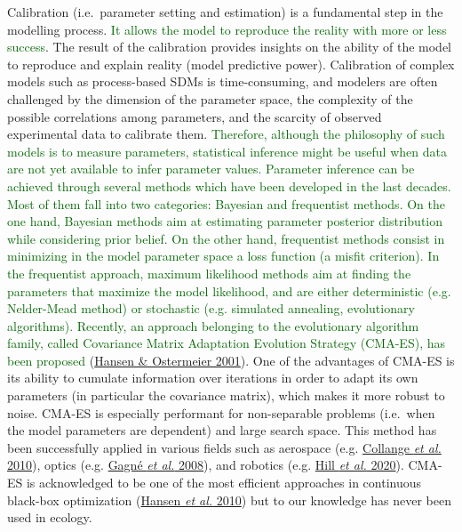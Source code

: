 \documentclass[11pt,]{article}
\begin{document}
Calibration (i.e.~parameter setting and estimation) is a fundamental
step in the modelling process.
\textcolor{darkgreen}{It allows the model to reproduce the reality with more or less success}.
The result of the calibration provides insights on the ability of the
model to reproduce and explain reality (model predictive power).
Calibration of complex models such as process-based SDMs is
time-consuming, and modelers are often challenged by the dimension of
the parameter space, the complexity of the possible correlations among
parameters, and the scarcity of observed experimental data to calibrate
them.
\textcolor{darkgreen}{Therefore, although the philosophy of such models is to measure parameters, statistical inference might be useful when data are not yet available to infer parameter values. Parameter inference can be achieved through several methods which have been developed in the last decades. Most of them fall into two categories: Bayesian and frequentist methods. On the one hand, Bayesian methods aim at estimating parameter posterior distribution while considering prior belief. On the other hand, frequentist methods consist in minimizing in the model parameter space a loss function (a misfit criterion). In the frequentist approach, maximum likelihood methods aim at finding the parameters that maximize the model likelihood, and are either deterministic (e.g. Nelder-Mead method) or stochastic (e.g. simulated annealing, evolutionary algorithms).     
Recently, an approach belonging to the evolutionary algorithm family, called Covariance Matrix Adaptation Evolution Strategy (CMA-ES), has been proposed}
(\protect\hyperlink{ref-Hansen2001}{Hansen \& Ostermeier 2001}). One of
the advantages of CMA-ES is its ability to cumulate information over
iterations in order to adapt its own parameters (in particular the
covariance matrix), which makes it more robust to noise. CMA-ES is
especially performant for non-separable problems (i.e.~when the model
parameters are dependent) and large search space. This method has been
successfully applied in various fields such as aerospace (e.g.
\protect\hyperlink{ref-Collange2010}{Collange \emph{et al.} 2010}),
optics (e.g. \protect\hyperlink{ref-Gagne2008}{Gagné \emph{et al.}
2008}), and robotics (e.g. \protect\hyperlink{ref-Hill2020}{Hill
\emph{et al.} 2020}). CMA-ES is acknowledged to be one of the most
efficient approaches in continuous black-box optimization
(\protect\hyperlink{ref-Hansen2010}{Hansen \emph{et al.} 2010}) but to
our knowledge has never been used in ecology.
\end{document}
